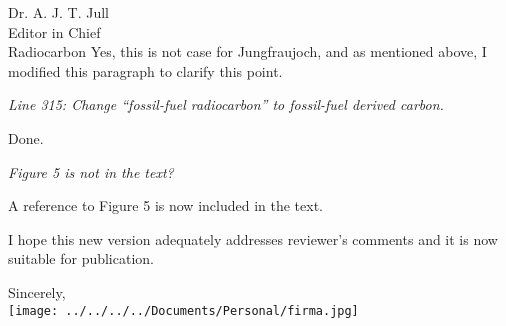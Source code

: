 \documentclass[11pt]{bgcletter}
\begin{document}
\begin{letter}{Dr. A. J. T. Jull \\
 Editor in Chief \\ Radiocarbon}
{\color{blue} Yes, this is not case for Jungfraujoch, and as mentioned above, I modified this paragraph to clarify this point. }

{\it Line 315:  Change ``fossil-fuel radiocarbon'' to fossil-fuel derived carbon.}

{\color{blue} Done.}

{\it Figure 5 is not in the text?}

{\color{blue} A reference to Figure 5 is now included in the text.}

\vspace{2em}
I hope this new version adequately addresses reviewer's comments and it is now suitable for publication.

\closing{Sincerely, \\
 \texttt{[image: ../../../../Documents/Personal/firma.jpg]}
 }
 \end{letter}

 
\end{document}
